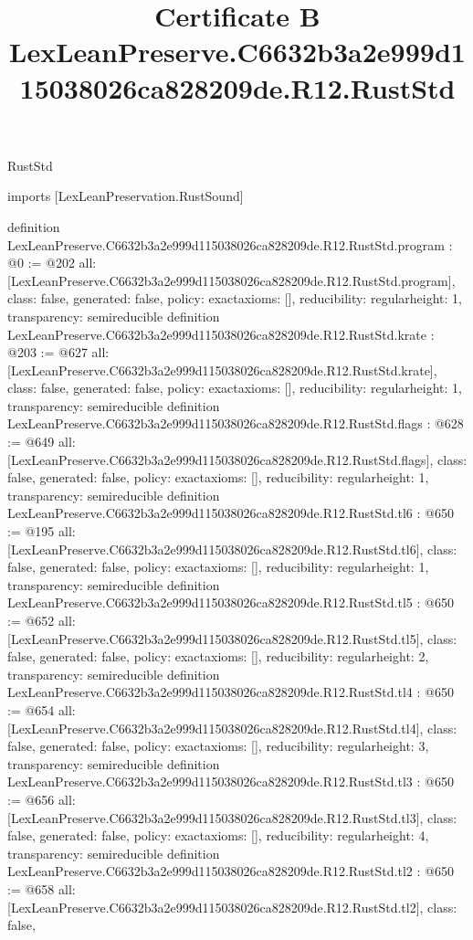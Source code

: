 \begin{lexlean}{RustStd}
\title{Certificate B LexLeanPreserve.C6632b3a2e999d115038026ca828209de.R12.RustStd}
\begin{coremodule}
imports [LexLeanPreservation.RustSound]

definition LexLeanPreserve.C6632b3a2e999d115038026ca828209de.R12.RustStd.program : @0 := @202 {
  all: [LexLeanPreserve.C6632b3a2e999d115038026ca828209de.R12.RustStd.program],
  class: false,
  generated: false,
  policy: exact{axioms: []},
  reducibility: regular{height: 1},
  transparency: semireducible
}
definition LexLeanPreserve.C6632b3a2e999d115038026ca828209de.R12.RustStd.krate : @203 := @627 {
  all: [LexLeanPreserve.C6632b3a2e999d115038026ca828209de.R12.RustStd.krate],
  class: false,
  generated: false,
  policy: exact{axioms: []},
  reducibility: regular{height: 1},
  transparency: semireducible
}
definition LexLeanPreserve.C6632b3a2e999d115038026ca828209de.R12.RustStd.flags : @628 := @649 {
  all: [LexLeanPreserve.C6632b3a2e999d115038026ca828209de.R12.RustStd.flags],
  class: false,
  generated: false,
  policy: exact{axioms: []},
  reducibility: regular{height: 1},
  transparency: semireducible
}
definition LexLeanPreserve.C6632b3a2e999d115038026ca828209de.R12.RustStd.tl6 : @650 := @195 {
  all: [LexLeanPreserve.C6632b3a2e999d115038026ca828209de.R12.RustStd.tl6],
  class: false,
  generated: false,
  policy: exact{axioms: []},
  reducibility: regular{height: 1},
  transparency: semireducible
}
definition LexLeanPreserve.C6632b3a2e999d115038026ca828209de.R12.RustStd.tl5 : @650 := @652 {
  all: [LexLeanPreserve.C6632b3a2e999d115038026ca828209de.R12.RustStd.tl5],
  class: false,
  generated: false,
  policy: exact{axioms: []},
  reducibility: regular{height: 2},
  transparency: semireducible
}
definition LexLeanPreserve.C6632b3a2e999d115038026ca828209de.R12.RustStd.tl4 : @650 := @654 {
  all: [LexLeanPreserve.C6632b3a2e999d115038026ca828209de.R12.RustStd.tl4],
  class: false,
  generated: false,
  policy: exact{axioms: []},
  reducibility: regular{height: 3},
  transparency: semireducible
}
definition LexLeanPreserve.C6632b3a2e999d115038026ca828209de.R12.RustStd.tl3 : @650 := @656 {
  all: [LexLeanPreserve.C6632b3a2e999d115038026ca828209de.R12.RustStd.tl3],
  class: false,
  generated: false,
  policy: exact{axioms: []},
  reducibility: regular{height: 4},
  transparency: semireducible
}
definition LexLeanPreserve.C6632b3a2e999d115038026ca828209de.R12.RustStd.tl2 : @650 := @658 {
  all: [LexLeanPreserve.C6632b3a2e999d115038026ca828209de.R12.RustStd.tl2],
  class: false,
}
\end{coremodule}
\end{lexlean}
